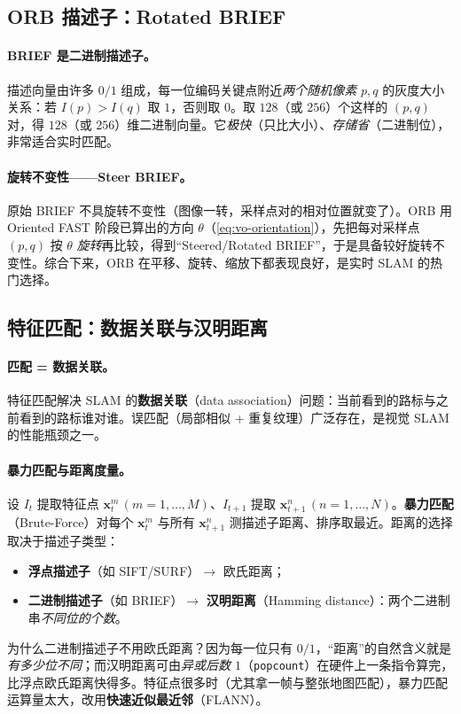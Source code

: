 \subsection{ORB 描述子：Rotated BRIEF}
\label{sec:vo-brief}

\paragraph{BRIEF 是二进制描述子\cite{gaoxiang2019slam14,carlone2026handbook}。}描述向量由许多 $0/1$ 组成，每一位编码关键点附近\emph{两个随机像素} $p,q$ 的灰度大小关系：若 $I(p)>I(q)$ 取 $1$，否则取 $0$。取 $128$（或 $256$）个这样的 $(p,q)$ 对，得 $128$（或 $256$）维二进制向量。它\emph{极快}（只比大小）、\emph{存储省}（二进制位），非常适合实时匹配。

\paragraph{旋转不变性——Steer BRIEF\cite{gaoxiang2019slam14}。}原始 BRIEF 不具旋转不变性（图像一转，采样点对的相对位置就变了）。ORB 用 Oriented FAST 阶段已算出的方向 $\theta$（\cref{eq:vo-orientation}），先把每对采样点 $(p,q)$ 按 $\theta$ \emph{旋转}再比较，得到“Steered/Rotated BRIEF”，于是具备较好旋转不变性。综合下来，ORB 在平移、旋转、缩放下都表现良好，是实时 SLAM 的热门选择。

\subsection{特征匹配：数据关联与汉明距离}
\label{sec:vo-match}

\paragraph{匹配 = 数据关联\cite{gaoxiang2019slam14}。}特征匹配解决 SLAM 的\textbf{数据关联}（data association）问题：当前看到的路标与之前看到的路标谁对谁。误匹配（局部相似 + 重复纹理）广泛存在，是视觉 SLAM 的性能瓶颈之一。

\paragraph{暴力匹配与距离度量。}设 $I_t$ 提取特征点 $\mathbf{x}_t^m\,(m=1,\dots,M)$、$I_{t+1}$ 提取 $\mathbf{x}_{t+1}^n\,(n=1,\dots,N)$。\textbf{暴力匹配}（Brute-Force）对每个 $\mathbf{x}_t^m$ 与所有 $\mathbf{x}_{t+1}^n$ 测描述子距离、排序取最近。距离的选择取决于描述子类型：
\begin{itemize}
  \item \textbf{浮点描述子}（如 SIFT/SURF）$\to$ 欧氏距离；
  \item \textbf{二进制描述子}（如 BRIEF）$\to$ \textbf{汉明距离}（Hamming distance）：两个二进制串\emph{不同位的个数}。
\end{itemize}
为什么二进制描述子不用欧氏距离？因为每一位只有 $0/1$，“距离”的自然含义就是\emph{有多少位不同}；而汉明距离可由\emph{异或后数 $1$}（\texttt{popcount}）在硬件上一条指令算完，比浮点欧氏距离快得多。特征点很多时（尤其拿一帧与整张地图匹配），暴力匹配运算量太大，改用\textbf{快速近似最近邻}（FLANN）。

